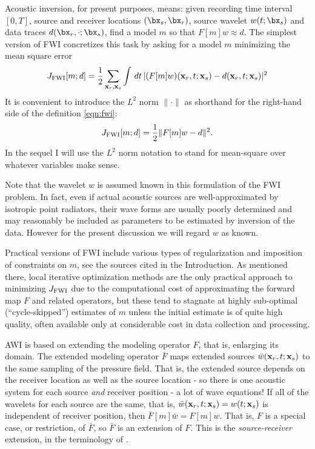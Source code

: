 Acoustic inversion, for present purposes, means: given recording time interval
$[0,T]$, source and receiver locations $(\bx_s,\bx_r)$, source wavelet
$w(t;\bx_s)$ and data traces $d(\bx_r,\cdot;\bx_s)$, find a model $m$
so that $F[m]w \approx d$. The
simplest version of FWI concretizes this task by asking for a model
$m$ minimizing the mean square error
\begin{equation}
  \label{eqn:fwi}
  J_{\rm FWI}[m;d] =\frac{1}{2} \sum_{{\bf x}_r,{\bf x}_s} \int\,dt\, |(F[m]w)({\bf x}_r,t;{\bf x}_s) - d({\bf x}_r,t;{\bf x}_s)|^2
\end{equation}
It is convenient to introduce the $L^2$ norm $\| \cdot \|$ as
shorthand for the right-hand side of the definition \ref{eqn:fwi}:
\[
  J_{\rm FWI}[m;d]= \frac{1}{2}\|F[m]w-d\|^2.
\]
In the sequel I will use the $L^2$ norm notation to stand for
mean-square over whatever variables make sense.

Note that the wavelet $w$ is assumed known in this formulation of the
FWI problem. In fact, even if actual acoustic sources are
well-approximated by isotropic point radiators, their wave forms are
usually poorly determined and may reasonably be
included as  parameters to be estimated by inversion of the
data. However for the present discussion we will regard $w$ as known.

Practical versions of FWI include various types of regularization and
imposition of constraints on $m$, see the sources cited in the
Introduction. As mentioned there, local iterative optimization methods
are the only practical approach to minimizing $J_{\rm FWI}$ due to the
computational cost of approximating the forward map $F$ and related
operators, but these tend to stagnate at highly sub-optimal
(``cycle-skipped'') estimates of $m$ unless the initial estimate is of
quite high quality, often available only at considerable cost in data
collection and processing.

AWI is based on extending the modeling operator $F$, that is, enlarging its domain.
The extended modeling operator ${\bar F}$ maps extended sources
$\bar{w}({\bf x}_r,t;{\bf x}_s)$ to the same sampling of the pressure
field. That is, the extended source depends on the receiver location
as well as the source location - so there is one acoustic system for
each source {\em and} receiver position - a lot of wave equations! If all
of the wavelets for each source are the same, that is, ${\bar w}({\bf
  x}_r,t;{\bf x}_s) = w(t;{\bf x}_s)$ is independent of receiver
position, then ${\bar F}[m]\bar{w} = F[m]w$. That is, $F$ is a special
case, or restriction, of ${\bar F}$, so ${\bar F}$ is an extension of
$F$. This is the {\em source-receiver} extension, in the terminology of \cite{HuangSymes2015SEG}.

